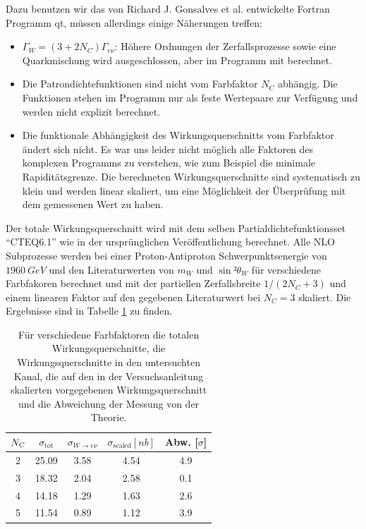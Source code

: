 \documentclass[a4paper,12pt]{article}
\begin{document}
Dazu benutzen wir das von Richard J. Gonsalves et al. entwickelte Fortran Programm qt\cite{qtsite},
müssen allerdings einige Näherungen treffen:
\begin{itemize}
	\item $Γ_W = (3+2N_C)Γ_{eν}$: Höhere Ordnungen der Zerfallsprozesse sowie eine Quarkmischung
		wird ausgeschlossen, aber im Programm mit berechnet.
	\item Die Patrondichtefunktionen sind nicht vom Farbfaktor $N_C$ abhängig. Die Funktionen stehen
		im Programm nur als feste Wertepaare zur Verfügung und werden nicht explizit berechnet.
	\item Die funktionale Abhängigkeit des Wirkungsquerschnitts vom Farbfaktor ändert sich nicht. Es
		war uns leider nicht möglich alle Faktoren des komplexen Programms zu verstehen, wie zum
		Beispiel die minimale Rapiditätsgrenze. Die berechneten Wirkungsquerschnitte sind
		systematisch zu klein und werden linear skaliert, um eine Möglichkeit der Überprüfung mit dem gemessenen
		Wert zu haben.
\end{itemize}

Der totale Wirkungsquerschnitt wird mit dem selben Partialdichtefunktionsset "`CTEQ6.1"' wie in der ursprünglichen
Veröffentlichung\cite{Abachi:1996ey} berechnet. Alle NLO Subprozesse werden bei einer
Proton-Antiproton Schwerpunktsenergie von $\SI{1960}{GeV}$ und den Literaturwerten von $m_W$ und
$\sin²θ_W$ für verschiedene Farbfakoren berechnet
und mit der partiellen Zerfallsbreite $1/(2N_C +3)$ und einem linearen Faktor auf den gegebenen
Literaturwert bei $N_C = 3$ skaliert.
Die Ergebnisse sind in Tabelle \ref{tab:color} zu finden.

\begin{table}[h]
	\centering
	\begin{tabular}{c| c c c|c}
		$N_{\textsl{C}}$ & $\sigma_\text{tot}$ &$σ_{W\rightarrow eν}$ & $σ_\text{scaled}[\si{nb}]$
		& Abw. [$σ$] \\
		\hline
2 & 25.09 & 3.58 & 4.54 & 4.9 \\
\hline
3 & 18.32 & 2.04 & 2.58 & 0.1 \\
4 & 14.18 & 1.29 & 1.63 & 2.6 \\
\hline
5 & 11.54 & 0.89 & 1.12 & 3.9 \\
	\end{tabular}
	\caption{Für verschiedene Farbfaktoren die totalen Wirkungsquerschnitte, die
		Wirkungsquerschnitte in den untersuchten Kanal, die auf den in der Versuchsanleitung
	skalierten vorgegebenen Wirkungsquerschnitt und die Abweichung der Messung von der Theorie.}
	\label{tab:color}
\end{table}
\end{document}

